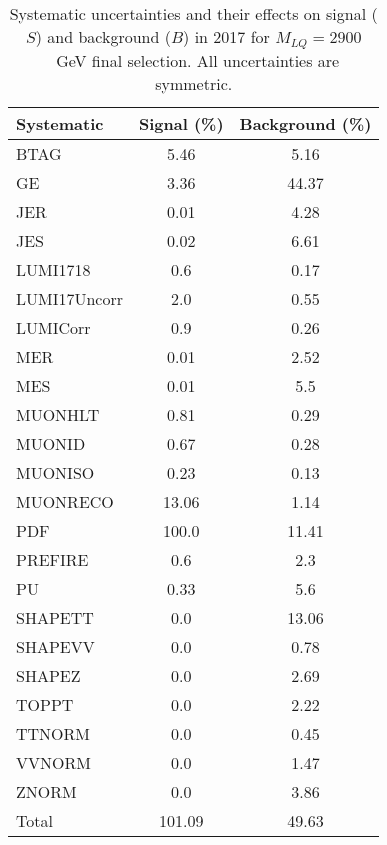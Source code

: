 \begin{table}[htbp]
\begin{center}
\caption{Systematic uncertainties and their effects on signal ($S$) and background ($B$) in 2017 for $M_{LQ}=2900$~GeV final selection. All uncertainties are symmetric.}
\begin{tabular}{lcc}
\hline\hline
Systematic & Signal (\%) & Background (\%) \\ \hline 
BTAG & 5.46 & 5.16\\ 
GE & 3.36 & 44.37\\ 
JER & 0.01 & 4.28\\ 
JES & 0.02 & 6.61\\ 
LUMI1718 & 0.6 & 0.17\\ 
LUMI17Uncorr & 2.0 & 0.55\\ 
LUMICorr & 0.9 & 0.26\\ 
MER & 0.01 & 2.52\\ 
MES & 0.01 & 5.5\\ 
MUONHLT & 0.81 & 0.29\\ 
MUONID & 0.67 & 0.28\\ 
MUONISO & 0.23 & 0.13\\ 
MUONRECO & 13.06 & 1.14\\ 
PDF & 100.0 & 11.41\\ 
PREFIRE & 0.6 & 2.3\\ 
PU & 0.33 & 5.6\\ 
SHAPETT & 0.0 & 13.06\\ 
SHAPEVV & 0.0 & 0.78\\ 
SHAPEZ & 0.0 & 2.69\\ 
TOPPT & 0.0 & 2.22\\ 
TTNORM & 0.0 & 0.45\\ 
VVNORM & 0.0 & 1.47\\ 
ZNORM & 0.0 & 3.86\\ 
Total & 101.09 & 49.63\\ \hline \hline
\end{tabular}
\label{tab:SysUncertainties_uujj_2900}
\end{center}
\end{table}

